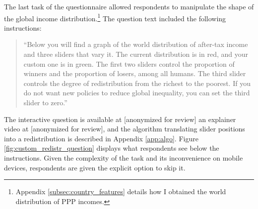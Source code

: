 \documentclass[12pt,english]{article}
\begin{document}
\begin{bibunit}
The last task of the questionnaire allowed respondents to manipulate the shape of the global income distribution.\footnote{Appendix \ref{subsec:country_features} details how I obtained the world distribution of PPP incomes.} The question text included the following instructions:
\begin{quote}``Below you will find a graph of the world distribution of after-tax income and three sliders that vary it. The current distribution is in red, and your custom one is in green. The first two sliders control the proportion of winners and the proportion of losers, among all humans. The third slider controls the degree of redistribution from the richest to the poorest.
If you do not want new policies to reduce global inequality, you can set the third slider to zero.''\end{quote}
The interactive question is available at [anonymized for review] %
an explainer video at [anonymized for review], %
and the algorithm translating slider positions into a redistribution is described in Appendix \ref{app:algo}. Figure \ref{fig:custom_redistr_question} displays what respondents see below the instructions.
Given the complexity of the task and its inconvenience on mobile devices, respondents are given the explicit option to skip it. 



\end{bibunit}
\end{document}
